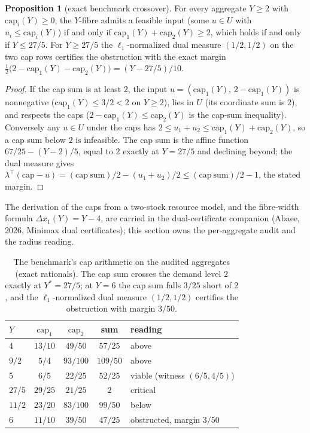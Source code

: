\documentclass[10pt,twocolumn]{article}
\theoremstyle{definition}
\newtheorem{proposition}{Proposition}
\begin{document}
\begin{proposition}[exact benchmark crossover]\label{prop:bench}
For every aggregate \(Y \ge 2\) with \(\mathrm{cap}_i(Y) \ge 0\), the
\(Y\)-fibre admits a feasible input (some \(u \in U\) with
\(u_i \le \mathrm{cap}_i(Y)\)) if and only if
\(\mathrm{cap}_1(Y) + \mathrm{cap}_2(Y) \ge 2\), which holds if and
only if \(Y \le 27/5\). For \(Y \ge 27/5\) the
\(\ell_1\)-normalized dual measure \((1/2, 1/2)\) on the two cap rows
certifies the obstruction with the exact margin
\(\tfrac12\bigl(2 - \mathrm{cap}_1(Y) - \mathrm{cap}_2(Y)\bigr) =
(Y - 27/5)/10\).
\end{proposition}

\begin{proof}
If the cap sum is at least \(2\), the input
\(u = (\mathrm{cap}_1(Y),\, 2 - \mathrm{cap}_1(Y))\) is nonnegative
(\(\mathrm{cap}_1(Y) \le 3/2 < 2\) on \(Y \ge 2\)), lies in
\(U\) (its coordinate sum is \(2\)), and respects the caps
(\(2 - \mathrm{cap}_1(Y) \le \mathrm{cap}_2(Y)\) is the cap-sum
inequality). Conversely any \(u \in U\) under the caps has
\(2 \le u_1 + u_2 \le \mathrm{cap}_1(Y) + \mathrm{cap}_2(Y)\), so a
cap sum below \(2\) is infeasible. The cap sum is the affine function
\(67/25 - (Y - 2)/5\), equal to \(2\) exactly at \(Y = 27/5\) and
declining beyond; the dual measure gives
\(\lambda^\top(\mathrm{cap} - u) = (\mathrm{cap\ sum})/2 -
(u_1 + u_2)/2 \le (\mathrm{cap\ sum})/2 - 1\), the stated margin.
\end{proof}

The derivation of the caps from a two-stock resource model, and the
fibre-width formula \(\Delta x_1(Y) = Y - 4\), are carried in the
dual-certificate companion (Abaee, 2026, Minimax dual certificates); this section owns the
per-aggregate audit and the radius reading.

\begin{table}[t]
\centering
\footnotesize
\caption{The benchmark's cap arithmetic on the audited aggregates
(exact rationals). The cap sum crosses the demand level \(2\) exactly
at \(Y^{*} = 27/5\); at \(Y = 6\) the cap sum falls \(3/25\) short of
\(2\), and the \(\ell_1\)-normalized dual measure \((1/2, 1/2)\) certifies the
obstruction with margin \(3/50\).}
\label{tab:bench}
\begin{tabular}{@{}l c c c l@{}}
\toprule
\(Y\) & \(\mathrm{cap}_1\) & \(\mathrm{cap}_2\) & sum & reading\\
\midrule
4 & $13/10$ & $49/50$ & $57/25$ & above\\
$9/2$ & $5/4$ & $93/100$ & $109/50$ & above\\
5 & $6/5$ & $22/25$ & $52/25$ & viable (witness $(6/5, 4/5)$)\\
$27/5$ & $29/25$ & $21/25$ & $2$ & critical\\
$11/2$ & $23/20$ & $83/100$ & $99/50$ & below\\
6 & $11/10$ & $39/50$ & $47/25$ & obstructed, margin $3/50$\\
\bottomrule
\end{tabular}
\end{table}
\end{document}

